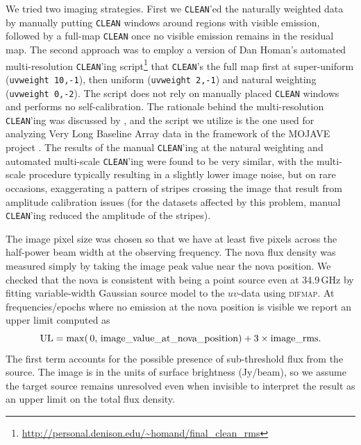 \documentclass[a4paper,fleqn,usenatbib]{mnras}
\begin{document}
We tried two imaging strategies. First we \texttt{CLEAN}'ed the naturally weighted data by manually 
putting \texttt{CLEAN} windows around regions with visible emission, followed
by a full-map \texttt{CLEAN} once no visible emission remains in the residual map. 
The second approach was to employ a version of Dan Homan's
automated multi-resolution \texttt{CLEAN}'ing script\footnote{\url{http://personal.denison.edu/~homand/final_clean_rms}}
that \texttt{CLEAN}'s the full map first at super-uniform (\texttt{uvweight 10,-1}),
then uniform (\texttt{uvweight 2,-1}) and natural weighting (\texttt{uvweight 0,-2}). 
The script does not rely on manually placed \texttt{CLEAN} windows and performs no self-calibration.
The rationale behind the multi-resolution \texttt{CLEAN}'ing was discussed
by \cite{1999PhDT.........8M}, and the script we utilize is the one used 
for analyzing Very Long Baseline Array data in the framework of the MOJAVE
project \citep{2009AJ....137.3718L}. The results of the manual \texttt{CLEAN}'ing
at the natural weighting and automated multi-scale \texttt{CLEAN}'ing were
found to be very similar, with the multi-scale procedure typically resulting
in a slightly lower image noise, but on rare occasions, exaggerating a
pattern of stripes crossing the image that result from amplitude calibration issues
(for the datasets affected by this problem, manual \texttt{CLEAN}'ing
reduced the amplitude of the stripes).

The image pixel size was chosen so that we have at least five pixels across the half-power beam width at the observing frequency. The nova flux density was measured simply by taking the image peak value near the nova position. We checked that the nova is consistent with being a point source even at 34.9\,GHz by fitting variable-width Gaussian source model to the $uv$-data using \textsc{difmap}. 
At frequencies/epochs where no emission at the nova position is visible we report an upper limit computed as 
\citep[e.g.][]{2023arXiv230109116N}
\begin{equation}
{\rm UL} = \max(\,0,\,{\rm image\_value\_at\_nova\_position}) + 3 \times {\rm image\_rms}.
\label{eq:radioUL}
\end{equation}
The first term accounts for the possible presence of sub-threshold flux from the source. The image is in the units of surface brightness (Jy/beam), so we assume the target source remains unresolved even when invisible to interpret the result as an upper limit on the total flux density.
\end{document}
